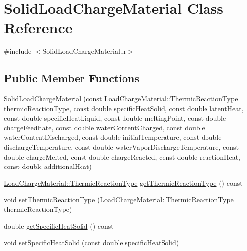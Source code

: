 \hypertarget{class_solid_load_charge_material}{}\section{Solid\+Load\+Charge\+Material Class Reference}
\label{class_solid_load_charge_material}


{\ttfamily \#include $<$Solid\+Load\+Charge\+Material.\+h$>$}

\subsection*{Public Member Functions}
\begin{DoxyCompactItemize}
\item 
\hyperlink{class_solid_load_charge_material_a9145db5518b94cfc1919b8d6ff809f5e}{Solid\+Load\+Charge\+Material} (const \hyperlink{namespace_load_charge_material_a51d4263e865a5d86236622dd3fe23fd1}{Load\+Charge\+Material\+::\+Thermic\+Reaction\+Type} thermic\+Reaction\+Type, const double specific\+Heat\+Solid, const double latent\+Heat, const double specific\+Heat\+Liquid, const double melting\+Point, const double charge\+Feed\+Rate, const double water\+Content\+Charged, const double water\+Content\+Discharged, const double initial\+Temperature, const double discharge\+Temperature, const double water\+Vapor\+Discharge\+Temperature, const double charge\+Melted, const double charge\+Reacted, const double reaction\+Heat, const double additional\+Heat)
\item 
\hyperlink{namespace_load_charge_material_a51d4263e865a5d86236622dd3fe23fd1}{Load\+Charge\+Material\+::\+Thermic\+Reaction\+Type} \hyperlink{class_solid_load_charge_material_a11708312a99ab985d980e1e521e0864c}{get\+Thermic\+Reaction\+Type} () const
\item 
void \hyperlink{class_solid_load_charge_material_ae2f85e0fbeff9f72b808bf86e645797f}{set\+Thermic\+Reaction\+Type} (\hyperlink{namespace_load_charge_material_a51d4263e865a5d86236622dd3fe23fd1}{Load\+Charge\+Material\+::\+Thermic\+Reaction\+Type} thermic\+Reaction\+Type)
\item 
double \hyperlink{class_solid_load_charge_material_af84f1f7dd167f67c0c02206339bbfe27}{get\+Specific\+Heat\+Solid} () const
\item 
void \hyperlink{class_solid_load_charge_material_ad9d2e3668a6a14700f4dced4882f98c0}{set\+Specific\+Heat\+Solid} (const double specific\+Heat\+Solid)
\item 

\end{DoxyCompactItemize}
